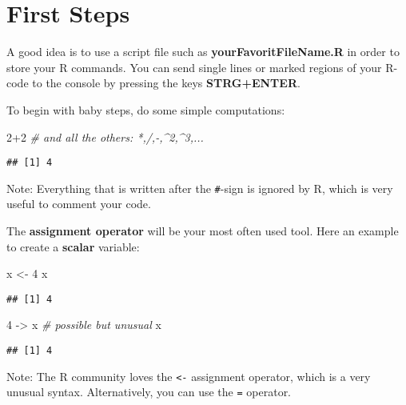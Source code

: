 \documentclass[
]{book}
\newenvironment{Shaded}{\begin{snugshade}}{\end{snugshade}}
\newcommand{\CommentTok}[1]{\textcolor[rgb]{0.56,0.35,0.01}{\textit{#1}}}
\newcommand{\DecValTok}[1]{\textcolor[rgb]{0.00,0.00,0.81}{#1}}
\newcommand{\NormalTok}[1]{#1}
\newcommand{\OtherTok}[1]{\textcolor[rgb]{0.56,0.35,0.01}{#1}}
\newcommand{\SpecialCharTok}[1]{\textcolor[rgb]{0.00,0.00,0.00}{#1}}
\begin{document}
\hypertarget{first-steps}{%
\section{First Steps}\label{first-steps}}

A good idea is to use a script file such as \textbf{yourFavoritFileName.R} in order to store your R commands. You can send single lines or marked regions of your R-code to the console by pressing the keys \textbf{STRG+ENTER}.

To begin with baby steps, do some simple computations:

\begin{Shaded}
\begin{Highlighting}[]
\DecValTok{2}\SpecialCharTok{+}\DecValTok{2} \CommentTok{\# and all the others: *,/,{-},\^{}2,\^{}3,... }
\end{Highlighting}
\end{Shaded}

\begin{verbatim}
## [1] 4
\end{verbatim}

Note: Everything that is written after the \texttt{\#}-sign is ignored by R, which is very useful to comment your code.

The \textbf{assignment operator} will be your most often used tool. Here an example to create a \textbf{scalar} variable:

\begin{Shaded}
\begin{Highlighting}[]
\NormalTok{x }\OtherTok{\textless{}{-}} \DecValTok{4} 
\NormalTok{x}
\end{Highlighting}
\end{Shaded}

\begin{verbatim}
## [1] 4
\end{verbatim}

\begin{Shaded}
\begin{Highlighting}[]
\DecValTok{4} \OtherTok{{-}\textgreater{}}\NormalTok{ x }\CommentTok{\# possible but unusual}
\NormalTok{x}
\end{Highlighting}
\end{Shaded}

\begin{verbatim}
## [1] 4
\end{verbatim}

Note: The R community loves the \texttt{\textless{}-} assignment operator, which is a very unusual syntax. Alternatively, you can use the \texttt{=} operator.
\end{document}
